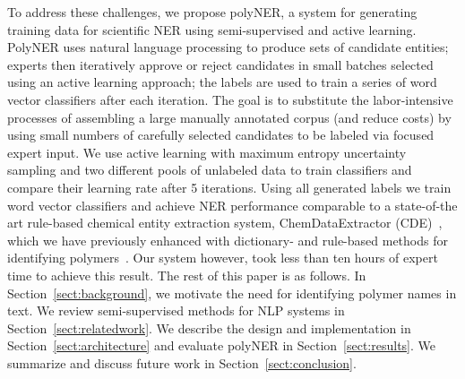 To address these challenges, we propose polyNER, a system for generating training data for scientific NER using semi-supervised and active learning. 
PolyNER uses natural language processing to produce sets of candidate entities;
experts then iteratively approve or reject candidates in small batches selected using an active learning approach;
the labels are used to train a series of word vector classifiers after each iteration.
The goal is
to substitute the labor-intensive processes of assembling a large
manually annotated corpus (and reduce costs) by using small numbers of carefully selected candidates to be labeled via focused expert input. 
We use active learning with maximum entropy uncertainty sampling and two different pools of unlabeled data to train classifiers and compare their learning rate after 5 iterations. 
Using all generated labels we train word vector classifiers and achieve NER performance comparable to 
a state-of-the art rule-based chemical entity extraction
system, ChemDataExtractor (CDE)~\cite{swain2016chemdataextractor}, which we have previously enhanced
with dictionary- and rule-based methods for identifying polymers~\cite{tchoua2017towards}.
Our system however, took less than ten hours of expert time to achieve this result.
The rest of this paper is as follows. 
In Section~\ref{sect:background}, we motivate the need for identifying polymer names in
text. 
We review semi-supervised methods for NLP systems in
Section~\ref{sect:relatedwork}. 
We describe the design and implementation in Section~\ref{sect:architecture} and evaluate polyNER
in Section~\ref{sect:results}. We summarize and discuss future work in Section~\ref{sect:conclusion}.